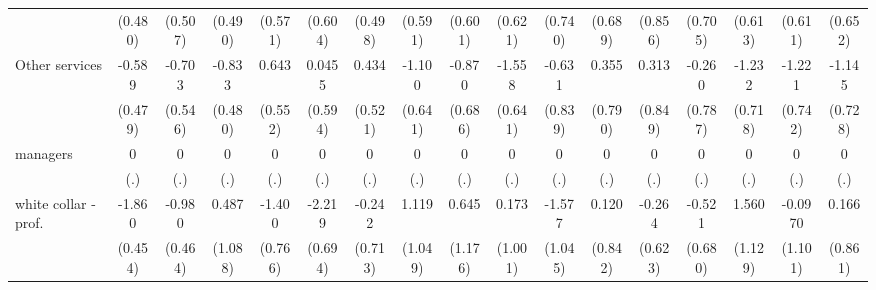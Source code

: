 {\begin{tabular}{l*{16}{c}}
                    &     (0.480)         &     (0.507)         &     (0.490)         &     (0.571)         &     (0.604)         &     (0.498)         &     (0.591)         &     (0.601)         &     (0.621)         &     (0.740)         &     (0.689)         &     (0.856)         &     (0.705)         &     (0.613)         &     (0.611)         &     (0.652)         \\
[1em]
Other services      &      -0.589         &      -0.703         &      -0.833         &       0.643         &      0.0455         &       0.434         &      -1.100         &      -0.870         &      -1.558\sym{*}  &      -0.631         &       0.355         &       0.313         &      -0.260         &      -1.232         &      -1.221         &      -1.145         \\
                    &     (0.479)         &     (0.546)         &     (0.480)         &     (0.552)         &     (0.594)         &     (0.521)         &     (0.641)         &     (0.686)         &     (0.641)         &     (0.839)         &     (0.790)         &     (0.849)         &     (0.787)         &     (0.718)         &     (0.742)         &     (0.728)         \\
[1em]
managers            &           0         &           0         &           0         &           0         &           0         &           0         &           0         &           0         &           0         &           0         &           0         &           0         &           0         &           0         &           0         &           0         \\
                    &         (.)         &         (.)         &         (.)         &         (.)         &         (.)         &         (.)         &         (.)         &         (.)         &         (.)         &         (.)         &         (.)         &         (.)         &         (.)         &         (.)         &         (.)         &         (.)         \\
[1em]
white collar - prof.&      -1.860\sym{***}&      -0.980\sym{*}  &       0.487         &      -1.400         &      -2.219\sym{**} &      -0.242         &       1.119         &       0.645         &       0.173         &      -1.577         &       0.120         &      -0.264         &      -0.521         &       1.560         &     -0.0970         &       0.166         \\
                    &     (0.454)         &     (0.464)         &     (1.088)         &     (0.766)         &     (0.694)         &     (0.713)         &     (1.049)         &     (1.176)         &     (1.001)         &     (1.045)         &     (0.842)         &     (0.623)         &     (0.680)         &     (1.129)         &     (1.101)         &     (0.861)         \\

\end{tabular}}
